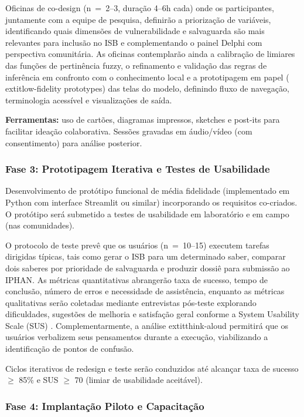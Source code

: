 Oficinas de co-design (n~=~2--3, duração 4--6h cada) onde os participantes, juntamente com a equipe de pesquisa, definirão a priorização de variáveis, identificando quais dimensões de vulnerabilidade e salvaguarda são mais relevantes para inclusão no ISB e complementando o painel Delphi com perspectiva comunitária. As oficinas contemplarão ainda a calibração de limiares das funções de pertinência fuzzy, o refinamento e validação das regras de inferência em confronto com o conhecimento local e a prototipagem em papel (	extit{low-fidelity prototypes}) das telas do modelo, definindo fluxo de navegação, terminologia acessível e visualizações de saída.

\textbf{Ferramentas:} uso de cartões, diagramas impressos, sketches e post-its para facilitar ideação colaborativa. Sessões gravadas em áudio/vídeo (com consentimento) para análise posterior.

\subsubsection{Fase 3: Prototipagem Iterativa e Testes de Usabilidade}

Desenvolvimento de protótipo funcional de média fidelidade (implementado em Python com interface Streamlit ou similar) incorporando os requisitos co-criados. O protótipo será submetido a testes de usabilidade em laboratório e em campo (nas comunidades).

O protocolo de teste prevê que os usuários (n~=~10--15) executem tarefas dirigidas típicas, tais como gerar o ISB para um determinado saber, comparar dois saberes por prioridade de salvaguarda e produzir dossiê para submissão ao IPHAN. As métricas quantitativas abrangerão taxa de sucesso, tempo de conclusão, número de erros e necessidade de assistência, enquanto as métricas qualitativas serão coletadas mediante entrevistas pós-teste explorando dificuldades, sugestões de melhoria e satisfação geral conforme a System Usability Scale (SUS) \cite{Brooke1996}. Complementarmente, a análise 	extit{think-aloud} permitirá que os usuários verbalizem seus pensamentos durante a execução, viabilizando a identificação de pontos de confusão.

Ciclos iterativos de redesign e teste serão conduzidos até alcançar taxa de sucesso $\geq$ 85\% e SUS $\geq$ 70 (limiar de usabilidade aceitável).

\subsubsection{Fase 4: Implantação Piloto e Capacitação}

